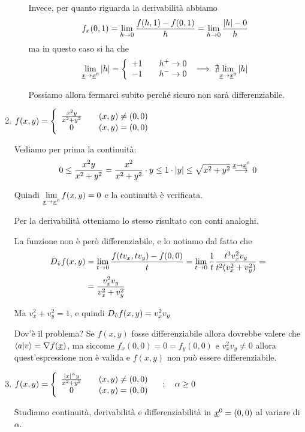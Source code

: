 \begin{enumerate}
\begin{enumerate}
		Invece, per quanto riguarda la derivabilità abbiamo
		\begin{align}
		f_x(0,1)=\underset{h \rightarrow 0}{\lim} \, \frac{f(h,1) - f(0,1)}{h}= \underset{h \rightarrow 0}{\lim} \, \frac{\left| h \right| - 0}{h}
		\end{align}
		ma in questo caso si ha che
		\begin{align}
		\underset{\underline{x} \rightarrow \underline{x}^0}{\lim} \,|h|=\left\{\begin{array}{cc} +1 \quad {}& h^+ \rightarrow 0 \\ -1 \quad & h^- \rightarrow 0 \end{array}\right. \implies \nexists \underset{\underline{x} \rightarrow \underline{x}^0}{\lim} \,|h|
		\end{align}
		
		Possiamo allora fermarci subito perché sicuro non sarà differenziabile.
	\end{enumerate}
	
	\item $f(x,y)=\left\{\begin{array}{cc} \frac{x^2 y}{x^2 +y^2} \quad {}& (x,y )\neq (0,0) \\ 0 \quad &(x,y)=(0,0) \end{array}\right.$
	
	Vediamo per prima la continuità:
	\begin{align}
	0 \leq \frac{x^2 y}{x^2 +y^2} = \frac{x^2}{x^2 +y^2}\cdot y \leq 1 \cdot |y| \leq \sqrt{x^2 + y^2} \overset{\underline{x} \rightarrow \underline{x}^0}{\longrightarrow}0
	\end{align}
	
	Quindi $\underset{\underline{x} \rightarrow \underline{x}^0}{\lim} \, f(x,y)=0$ e la continuità è verificata.
	
	Per la derivabilità otteniamo lo stesso risultato con conti analoghi.
	
	La funzione non è però differenziabile, e lo notiamo dal fatto che
	\begin{align}
	D_{\hat v} f(x,y){}&=\underset{t \rightarrow 0}{\lim} \, \frac{f(tv_x,tv_y) - f(0,0)}{t}= \underset{t \rightarrow 0}{\lim} \, \frac{1}{t} \frac{t^3 v_x^2 v_y}{t^2 (v_x^2 +v_y^2)}= \nonumber \\
	&=\frac{v_x^2 v_y}{v_x^2 +v_y^2}
	\end{align}
	
	Ma $v_x^2 +v_y^2 = 1$, e quindi $D_{\hat v} f(x,y)=v_x^2 v_y$
	
	Dov'è il problema? Se $f(x,y)$ fosse differenziabile allora dovrebbe valere che $\braket{a|v}=\nabla f(\underline{x})$, ma siccome $f_x(0,0)=0=f_y(0,0)$ e $v_x^2 v_y \neq 0$ allora quest'espressione non è valida e $f(x,y)$ non può essere differenziabile.
	
	\item $f(x,y)=\left\{\begin{array}{cc} \frac{|x|^\alpha y}{x^2 + y^2} \quad {}& (x,y)\neq (0,0) \\ 0 \quad &(x,y)=(0,0) \end{array}\right. \quad ; \quad \alpha \geq 0$
	
	Studiamo continuità, derivabilità e differenziabilità in $\underline{x}^0=(0,0)$ al variare di $\alpha$.
	

\end{enumerate}
